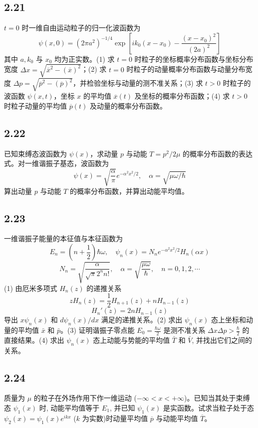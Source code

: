 \newpage
\subsection{2.21}
$t = 0$ 时一维自由运动粒子的归一化波函数为
$$\psi (x, 0) = (2\pi a^2)^{-1/4} \exp \left[ i k_0 (x - x_0) - \frac{(x - x_0)^2}{(2a)^2} \right]$$
其中 $a, k_0$ 与 $x_0$ 均为正实数。(1) 求 $t = 0$ 时粒子的坐标概率分布函数与坐标分布宽度 $\Delta x = \sqrt{\overline{x}^2 - (\overline{x})^2}$；(2) 求 $t = 0$ 时粒子的动量概率分布函数与动量分布宽度 $\Delta p = \sqrt{\overline{p}^2 - (\overline{p})^2}$，并检验坐标与动量的测不准关系；(3) 求 $t > 0$ 时粒子的波函数 $\psi (x, t)$，坐标 $x$ 的平均值 $\overline{x}(t)$ 及坐标的概率分布函数；(4) 求 $t > 0$ 时粒子动量的平均值 $\overline{p}(t)$ 及动量的概率分布函数。

\subsection{2.22}
已知束缚态波函数为 $\psi(x)$，求动量 $p$ 与动能 $T = p^2 / 2\mu$ 的概率分布函数的表达式。对一维谐振子基态，波函数为
$$\psi(x) = \sqrt{\frac{\alpha}{\pi}} e^{-\alpha^2 x^2 / 2}, \quad \alpha = \sqrt{\mu \omega / \hbar}$$
算出动量 $p$ 与动能 $T$ 的概率分布函数，并算出动能平均值。

\subsection{2.23}
一维谐振子能量的本征值与本征函数为
$$E_n = \left( n + \frac{1}{2} \right) \hbar \omega, \quad \psi_n(x) = N_n e^{-\alpha^2 x^2 / 2} H_n (\alpha x)$$
$$N_n = \sqrt{\frac{\alpha}{\sqrt{\pi} 2^n n!}}, \quad \alpha = \sqrt{\frac{\mu \omega}{\hbar}}, \quad n = 0, 1, 2, \cdots$$
(1) 由厄米多项式 $H_n(z)$ 的递推关系
$$zH_n(z) = \frac{1}{2} H_{n+1}(z) + nH_{n-1}(z)$$
$$H_n'(z) = 2nH_{n-1}(z)$$
导出 $x \psi_n(x)$ 和 $d \psi_n(x) / dx$ 满足的递推关系。(2) 求出 $\psi_n(x)$ 态上坐标和动量的平均值 $\bar{x}$ 和 $\bar{p}$。(3) 证明谐振子零点能 $E_0 = \frac{\hbar \omega}{2}$ 是测不准关系 $\Delta x \Delta p > \frac{\hbar}{2}$ 的直接结果。(4) 求出 $\psi_n(x)$ 态上动能与势能的平均值 $\bar{T}$ 和 $\bar{V}$, 并找出它们之间的关系。

\subsection{2.24}
质量为 $\mu$ 的粒子在外场作用下作一维运动 ($-\infty < x < +\infty$)。已知当其处于束缚态 $\psi_1(x)$ 时, 动能平均值等于 $E_1$, 并已知 $\psi_1(x)$ 是实函数。试求当粒子处于态 $\psi_2(x) = \psi_1(x) e^{ikx}$ ($k$ 为实数)时动量平均值 $\overline{p}$ 与动能平均值 $\overline{T}$。

